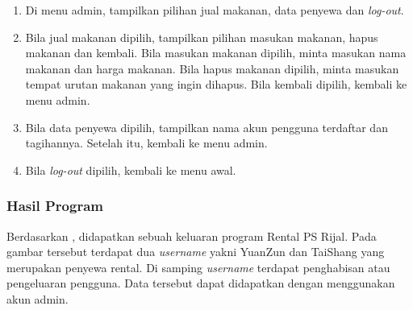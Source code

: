 \documentclass[../main.tex]{subfiles}
\begin{document}
{\begin{enumerate}[leftmargin=1.56cm]
            \item{Di menu admin, tampilkan pilihan jual makanan, data penyewa dan \textit{log-out}.}
            \item{Bila jual makanan dipilih, tampilkan pilihan masukan makanan, hapus makanan dan kembali. Bila masukan makanan dipilih, minta masukan nama makanan dan harga makanan. Bila hapus makanan dipilih, minta masukan tempat urutan makanan yang ingin dihapus. Bila kembali dipilih, kembali ke menu admin.}
            \item{Bila data penyewa dipilih, tampilkan nama akun pengguna terdaftar dan tagihannya. Setelah itu, kembali ke menu admin.}
            \item{Bila \textit{log-out} dipilih, kembali ke menu awal.}
        \end{enumerate}
    }
    \newpage
    \subsubsection{\Flowchart}

    \vspace{-0.5ex}
    \subsubsection{\SourceCode}
\begin{indentlevel0}
    \vspace{-0.15ex}
    
    
    
    
    
\end{indentlevel0}
    \subsubsection{Hasil Program}
    \begin{indentlevel0}
        \ilz{}Berdasarkan , didapatkan sebuah keluaran program Rental PS Rijal. Pada gambar tersebut terdapat dua \textit{username} yakni YuanZun dan TaiShang yang merupakan penyewa rental. Di samping \textit{username} terdapat penghabisan atau pengeluaran pengguna. Data tersebut dapat didapatkan dengan menggunakan akun admin.
    \end{indentlevel0}
\end{document}
